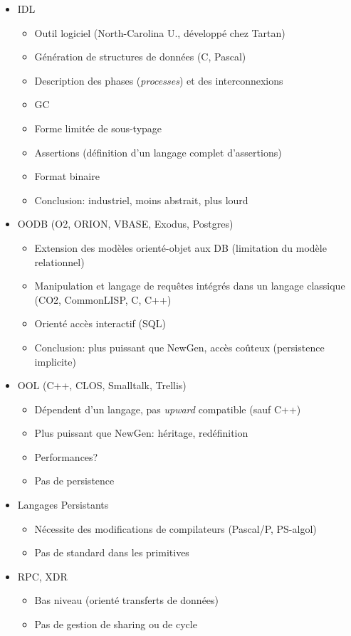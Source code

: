 \documentclass[11pt]{article}
\newcommand{\newgen}{NewGen}
\begin{document}
{\begin{itemize}
\item IDL
  \begin{itemize}
  \item Outil logiciel (North-Carolina U., développé chez Tartan)
  \item Génération de structures de données (C, Pascal)
  \item Description des phases ({\em processes}) et des interconnexions
  \item GC 
  \item Forme limitée de sous-typage
  \item Assertions (définition d'un langage complet d'assertions)
  \item Format binaire
  \item Conclusion: industriel, moins abstrait, plus lourd
  \end{itemize}
\item OODB (O2, ORION, VBASE, Exodus, Postgres)
  \begin{itemize}
  \item Extension des modèles orienté-objet aux DB (limitation du
modèle relationnel)
  \item Manipulation et langage de requêtes intégrés dans un langage
classique (CO2, CommonLISP, C, C++)
  \item Orienté accès interactif (SQL)
  \item Conclusion: plus puissant que \newgen, accès coûteux
(persistence implicite)
  \end{itemize}
\end{itemize}

\newpage

\vskip 2cm

\begin{itemize}
\item OOL (C++, CLOS, Smalltalk, Trellis)
  \begin{itemize}
  \item Dépendent d'un langage, pas {\em upward} compatible (sauf C++)
  \item Plus puissant que \newgen: héritage, redéfinition
  \item Performances?
  \item Pas de persistence
  \end{itemize}
\item Langages Persistants
  \begin{itemize}
  \item Nécessite des modifications de compilateurs (Pascal/P,
PS-algol)
  \item Pas de standard dans les primitives
  \end{itemize}
\item RPC, XDR
  \begin{itemize}
  \item Bas niveau (orienté transferts de données)
  \item Pas de gestion de sharing ou de cycle
  \end{itemize}
\end{itemize}

}
\end{document}
